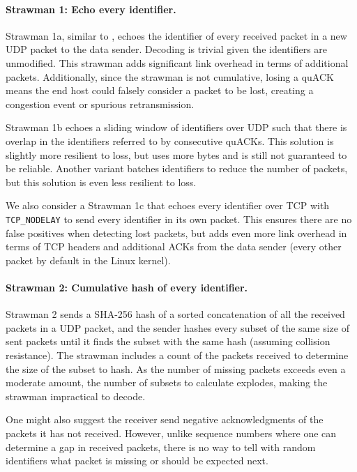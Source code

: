 \paragraph{Strawman 1: Echo every identifier.}
Strawman 1a, similar to \cite{li-tsvwg-loops-problem-opportunities-06,kramer2020lwpep},
echoes the identifier of every received packet in a new UDP packet to the data
sender.  Decoding is trivial given the identifiers are unmodified.
This strawman adds significant link overhead in terms of additional packets.
Additionally, since the strawman is not cumulative, losing a quACK means the
end host could falsely consider a packet to be lost, creating a congestion
event or spurious retransmission.

Strawman 1b echoes a sliding window of identifiers over UDP such that there is overlap
in the identifiers referred to by consecutive quACKs.
This solution is slightly more resilient to loss, but uses more bytes and is
still not guaranteed to be reliable.
Another variant batches identifiers to reduce the number of packets, but this
solution is even less resilient to loss.

We also consider a Strawman 1c that echoes every identifier over TCP with
\texttt{TCP\_NODELAY} to send every identifier in its own packet.
This ensures there are no false positives when detecting lost packets,
but adds even more link overhead in terms of TCP headers and additional ACKs
from the data sender (every other packet by default in the Linux kernel).

\paragraph{Strawman 2: Cumulative hash of every identifier.}
Strawman 2 sends a SHA-256 hash of a sorted concatenation of all the
received packets in a UDP packet, and the sender hashes every subset of the same size of
sent packets until it finds the subset with the same hash (assuming collision resistance).
The strawman includes
a count of the packets received to determine the size of the subset to hash.
As the number of missing packets exceeds even a moderate amount, the number
of subsets to calculate explodes, making the strawman impractical to decode.

\smallskip

One might also suggest the receiver send negative acknowledgments of the packets
it has not received. However, unlike sequence numbers where one can
determine a gap in received packets, there is no way to tell with random
identifiers what packet is missing or should be expected next.

